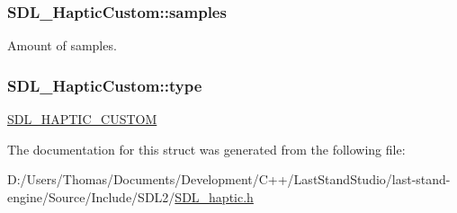 \subsubsection[{samples}]{ S\+D\+L\+\_\+\+Haptic\+Custom\+::samples}\label{structSDL__HapticCustom_a5905ea1b6182da846535ca8c80b4fa33}
Amount of samples. \hypertarget{structSDL__HapticCustom_a98a8995c94492069dc007502ed97eed2}{}
\subsubsection[{type}]{ S\+D\+L\+\_\+\+Haptic\+Custom\+::type}\label{structSDL__HapticCustom_a98a8995c94492069dc007502ed97eed2}
\hyperlink{SDL__haptic_8h_a8a18c4de1076ac9bebd718329d16db29}{S\+D\+L\+\_\+\+H\+A\+P\+T\+I\+C\+\_\+\+C\+U\+S\+T\+O\+M} 

The documentation for this struct was generated from the following file\+:\begin{DoxyCompactItemize}
\item 
D\+:/\+Users/\+Thomas/\+Documents/\+Development/\+C++/\+Last\+Stand\+Studio/last-\/stand-\/engine/\+Source/\+Include/\+S\+D\+L2/\hyperlink{SDL__haptic_8h}{S\+D\+L\+\_\+haptic.\+h}\end{DoxyCompactItemize}
